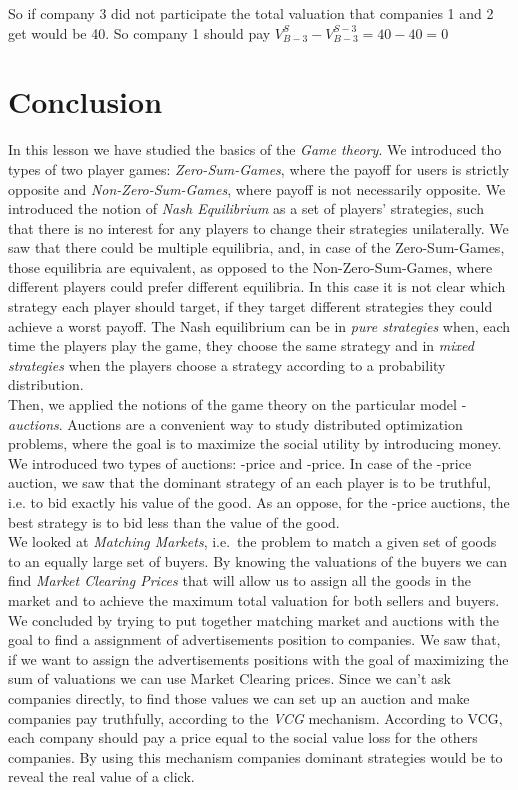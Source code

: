 \documentclass{article}
\begin{document}
So if company 3 did not participate the total valuation that companies 1 and 2 get would be 40. So company 1 should pay $V_{B-3}^{S}-V_{B-3}^{S-3}=40-40=0$

\section{Conclusion} In this lesson we have studied the basics of the \textit{Game theory}. We introduced tho types of two player games: \textit{Zero-Sum-Games}, where the payoff for users is strictly opposite and \textit{Non-Zero-Sum-Games}, where payoff is not necessarily opposite. We introduced the notion of \textit{Nash Equilibrium} as a set of players' strategies, such that there is no interest for any players to change their strategies unilaterally. We saw that there could be multiple equilibria, and, in case of the Zero-Sum-Games, those equilibria are equivalent, as opposed to the Non-Zero-Sum-Games, where different players could prefer  different equilibria. In this case it is not clear which strategy each player should target, if they target different strategies they could achieve a worst payoff. The Nash equilibrium can be in \textit{pure strategies} when, each time the players play the game, they choose the same strategy and in \textit{mixed strategies} when the players choose a strategy according to a probability distribution.\\
Then, we applied the notions of the game theory on the particular model - \textit{auctions}. Auctions are a convenient way to study distributed optimization problems, where the goal is to maximize the social utility by introducing money. We introduced two types of auctions: -price and -price. In case of the -price auction, we saw that the dominant strategy of an each player is to be truthful, i.e. to bid exactly his value of the good. As an oppose, for the -price auctions, the best strategy is to bid less than the value of the good. \\
We looked at \textit{Matching Markets}, i.e.~the problem to match a given set of goods to an equally large set of buyers. By knowing the valuations of the buyers we can find \textit{Market Clearing Prices} that will allow us to assign all the goods in the market and to achieve the maximum total valuation for both sellers and buyers.\\
We concluded by trying to put together matching market and auctions with the goal to find a assignment of advertisements position to companies. We saw that, if we want to assign the advertisements positions with the goal of maximizing the sum of valuations we can use Market Clearing prices. Since we can't ask companies directly, to find those values we can set up an auction and make companies pay truthfully, according to the \textit{VCG} mechanism. According to VCG, each company should pay a price equal to the social value loss for the others companies. By using this mechanism companies dominant strategies would be to reveal the real value of a click. 
\end{document}
